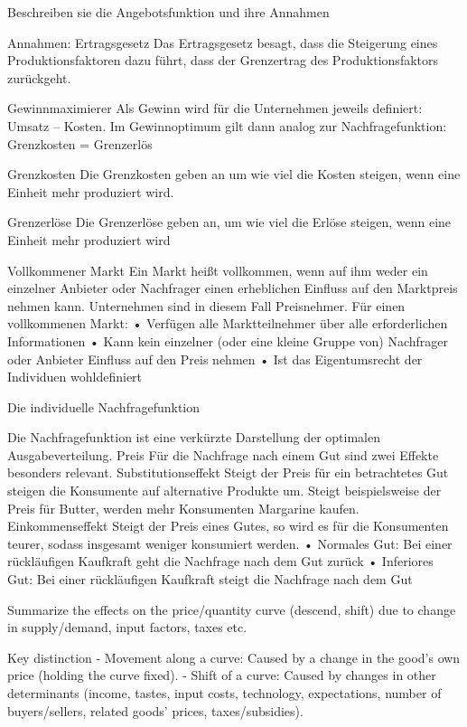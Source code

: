 Beschreiben sie die Angebotsfunktion und ihre Annahmen

Annahmen:
Ertragsgesetz
Das Ertragsgesetz besagt, dass die
Steigerung eines Produktionsfaktoren dazu
führt, dass der Grenzertrag des
Produktionsfaktors zurückgeht.


Gewinnmaximierer
Als Gewinn wird für die Unternehmen jeweils
definiert: Umsatz – Kosten.
Im Gewinnoptimum gilt dann analog zur
Nachfragefunktion:
Grenzkosten = Grenzerlös

Grenzkosten
Die Grenzkosten geben an um wie viel die
Kosten steigen, wenn eine Einheit mehr
produziert wird.

Grenzerlöse
Die Grenzerlöse geben an, um wie viel die
Erlöse steigen, wenn eine Einheit mehr
produziert wird

Vollkommener Markt
Ein Markt heißt vollkommen, wenn auf ihm
weder ein einzelner Anbieter oder
Nachfrager einen erheblichen Einfluss auf
den Marktpreis nehmen kann. Unternehmen
sind in diesem Fall Preisnehmer. Für einen
vollkommenen Markt:
• Verfügen alle Marktteilnehmer über alle
erforderlichen Informationen
• Kann kein einzelner (oder eine kleine
Gruppe von) Nachfrager oder Anbieter
Einfluss auf den Preis nehmen
• Ist das Eigentumsrecht der Individuen
wohldefiniert

Die individuelle Nachfragefunktion

Die Nachfragefunktion ist eine verkürzte Darstellung der optimalen
Ausgabeverteilung.
Preis
Für die Nachfrage nach einem Gut sind zwei Effekte besonders relevant.
Substitutionseffekt
Steigt der Preis für ein betrachtetes Gut steigen die Konsumente auf
alternative Produkte um. Steigt beispielsweise der Preis für Butter,
werden mehr Konsumenten Margarine kaufen.
Einkommenseffekt
Steigt der Preis eines Gutes, so wird es für die Konsumenten teurer,
sodass insgesamt weniger konsumiert werden.
• Normales Gut: Bei einer rückläufigen Kaufkraft geht die Nachfrage
nach dem Gut zurück
• Inferiores Gut: Bei einer rückläufigen Kaufkraft steigt die Nachfrage
nach dem Gut


Summarize the effects on the price/quantity curve (descend, shift) due to change in supply/demand, input factors, taxes etc.

Key distinction
- Movement along a curve: Caused by a change in the good’s own price (holding the curve fixed).
- Shift of a curve: Caused by changes in other determinants 
(income, tastes, input costs, technology, expectations, number of buyers/sellers, related goods’ prices, taxes/subsidies).


